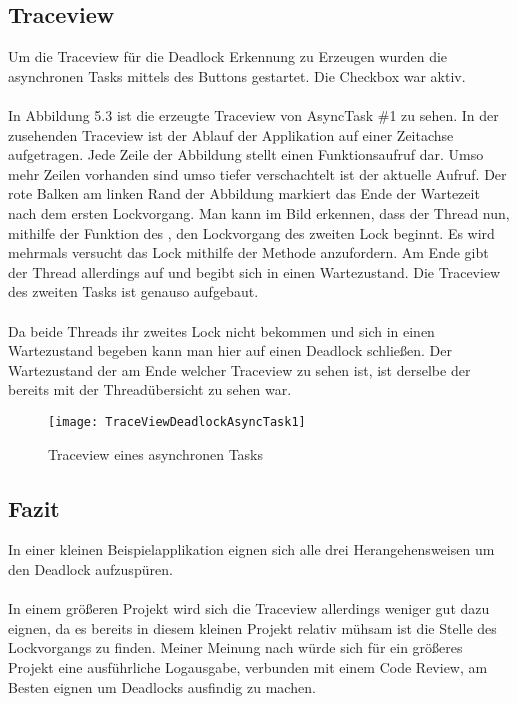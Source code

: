 \subsection{Traceview}
Um die Traceview für die Deadlock Erkennung zu Erzeugen wurden die asynchronen Tasks mittels des Buttons  gestartet. Die Checkbox  war aktiv.
\\
\\
In Abbildung 5.3 ist die erzeugte Traceview von AsyncTask \#1 zu sehen. In der zusehenden Traceview ist der Ablauf der Applikation auf einer Zeitachse aufgetragen. Jede Zeile der Abbildung stellt einen Funktionsaufruf dar. Umso mehr Zeilen vorhanden sind umso tiefer verschachtelt ist der aktuelle Aufruf. Der rote Balken am linken Rand der Abbildung markiert das Ende der Wartezeit nach dem ersten Lockvorgang. Man kann im Bild erkennen, dass der Thread nun, mithilfe der  Funktion des , den Lockvorgang des zweiten Lock beginnt. Es wird mehrmals versucht das Lock mithilfe der  Methode anzufordern. Am Ende gibt der Thread allerdings auf und begibt sich in einen Wartezustand. Die Traceview des zweiten Tasks ist genauso aufgebaut.
\\
\\
Da beide Threads ihr zweites Lock nicht bekommen und sich in einen Wartezustand begeben kann man hier auf einen Deadlock schließen. Der Wartezustand der am Ende welcher Traceview zu sehen ist, ist derselbe der bereits mit der Threadübersicht zu sehen war.

\begin{figure}
\centering
\texttt{[image: TraceViewDeadlockAsyncTask1]}
\caption{Traceview eines asynchronen Tasks}
\label{fig:TraceViewDeadlockAsyncTask1}
\end{figure}

\subsection{Fazit}
In einer kleinen Beispielapplikation eignen sich alle drei Herangehensweisen um den Deadlock aufzuspüren. 
\\
\\
In einem größeren Projekt wird sich die Traceview allerdings weniger gut dazu eignen, da es bereits in diesem kleinen Projekt relativ mühsam ist die Stelle des Lockvorgangs zu finden. Meiner Meinung nach würde sich für ein größeres Projekt eine ausführliche Logausgabe, verbunden mit einem Code Review, am Besten eignen um Deadlocks ausfindig zu machen.



